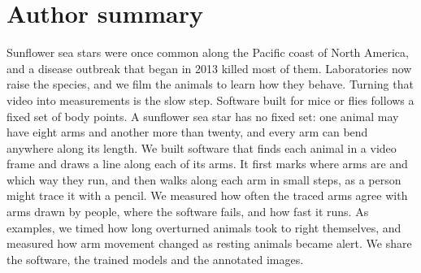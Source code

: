 \section*{Author summary}

Sunflower sea stars were once common along the Pacific coast of North America, and a disease outbreak that began in 2013 killed most of them.
Laboratories now raise the species, and we film the animals to learn how they behave.
Turning that video into measurements is the slow step.
Software built for mice or flies follows a fixed set of body points.
A sunflower sea star has no fixed set: one animal may have eight arms and another more than twenty, and every arm can bend anywhere along its length.
We built software that finds each animal in a video frame and draws a line along each of its arms.
It first marks where arms are and which way they run, and then walks along each arm in small steps, as a person might trace it with a pencil.
We measured how often the traced arms agree with arms drawn by people, where the software fails, and how fast it runs.
As examples, we timed how long overturned animals took to right themselves, and measured how arm movement changed as resting animals became alert.
We share the software, the trained models and the annotated images.
